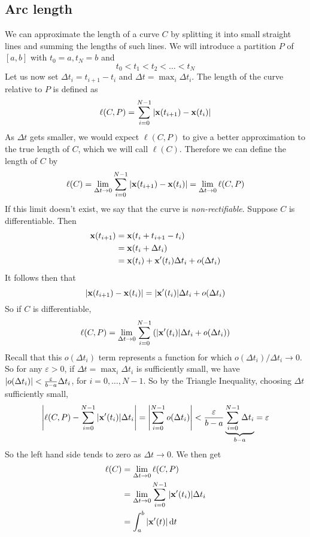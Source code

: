 \subsection{Arc length}
We can approximate the length of a curve \(C\) by splitting it into small straight lines and summing the lengths of such lines.
We will introduce a partition \(P\) of \([a, b]\) with \(t_0 = a, t_N = b\) and
\[
	t_0 < t_1 < t_2 < \dots < t_N
\]
Let us now set \(\Delta t_i = t_{i+1} - t_i\) and \(\Delta t = \max_i \Delta t_i\).
The length of the curve relative to \(P\) is defined as
\[
	\ell(C, P) = \sum_{i=0}^{N-1} \abs{\vb x(t_{i+1}) - \vb x(t_i)}
\]
As \(\Delta t\) gets smaller, we would expect \(\ell(C, P)\) to give a better approximation to the true length of \(C\), which we will call \(\ell(C)\).
Therefore we can define the length of \(C\) by
\[
	\ell(C) = \lim_{\Delta t \to 0} \sum_{i=0}^{N-1}\abs{\vb x(t_{i+1}) - \vb x(t_i)} = \lim_{\Delta t \to 0} \ell(C, P)
\]
If this limit doesn't exist, we say that the curve is \textit{non-rectifiable}.
Suppose \(C\) is differentiable.
Then
\begin{align*}
	\vb x(t_{i+1}) & = \vb x(t_i + t_{i+1} - t_i)                          \\
	               & = \vb x(t_i + \Delta t_i)                             \\
	               & = \vb x(t_i) + \vb x'(t_i) \Delta t_i + o(\Delta t_i)
\end{align*}
It follows then that
\[
	\abs{\vb x(t_{i+1}) - \vb x(t_i)} = \abs{\vb x'(t_i)}\Delta t_i + o(\Delta t_i)
\]
So if \(C\) is differentiable,
\[
	\ell(C, P) = \lim_{\Delta t \to 0} \sum_{i=0}^{N-1} \left( \abs{\vb x'(t_i)}\Delta t_i + o(\Delta t_i)  \right)
\]
Recall that this \(o(\Delta t_i)\) term represents a function for which \(o(\Delta t_i) / \Delta t_i \to 0\).
So for any \(\varepsilon > 0\), if \(\Delta t = \max_i \Delta t_i\) is sufficiently small, we have \(\abs{o(\Delta t_i)} < \frac{\varepsilon}{b-a}\Delta t_i\), for \(i = 0, \dots, N-1\).
So by the Triangle Inequality, choosing \(\Delta t\) sufficiently small,
\[
	\abs{\ell(C, P) - \sum_{i=0}^{N-1} \abs{\vb x'(t_i)}\Delta t_i} = \abs{\sum_{i=0}^{N-1} o(\Delta t_i)} < \frac{\varepsilon}{b-a}\underbrace{\sum_{i=0}^{N-1} \Delta t_i}_{b-a} = \varepsilon
\]
So the left hand side tends to zero as \(\Delta t \to 0\).
We then get
\begin{align*}
	\ell(C) & = \lim_{\Delta t \to 0} \ell(C, P)                                     \\
	        & = \lim_{\Delta t \to 0} \sum_{i=0}^{N - 1} \abs{\vb x'(t_i)}\Delta t_i \\
	        & = \int_a^b \abs{\vb x'(t)} \dd{t}
\end{align*}
